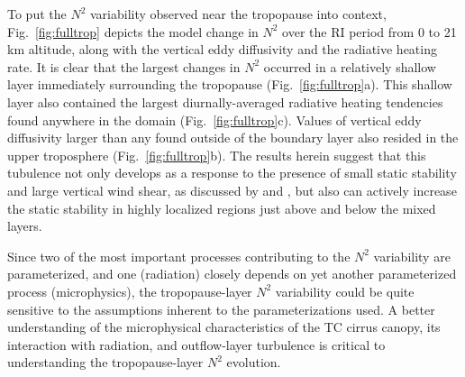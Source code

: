 \documentclass{ametsoc}
\begin{document}
To put the $N^2$ variability observed near the tropopause into context, Fig.~\ref{fig:fulltrop} depicts the model change in $N^2$ over the RI period from 0 to 21 km altitude, along with the vertical eddy diffusivity and the radiative heating rate.
It is clear that the largest changes in $N^2$ occurred in a relatively shallow layer immediately surrounding the tropopause (Fig.~\ref{fig:fulltrop}a).
This shallow layer also contained the largest diurnally-averaged radiative heating tendencies found anywhere in the domain (Fig.~\ref{fig:fulltrop}c).
Values of vertical eddy diffusivity larger than any found outside of the boundary layer also resided in the upper troposphere (Fig.~\ref{fig:fulltrop}b).
The results herein suggest that this tubulence not only develops as a response to the presence of small static stability and large vertical wind shear, as discussed by \cite{Molinarietal} and \cite{DuranMolinari2016}, but also can actively increase the static stability in highly localized regions just above and below the mixed layers.

Since two of the most important processes contributing to the $N^2$ variability are parameterized, and one (radiation) closely depends on yet another parameterized process (microphysics), the tropopause-layer $N^2$ variability could be quite sensitive to the assumptions inherent to the parameterizations used.
A better understanding of the microphysical characteristics of the TC cirrus canopy, its interaction with radiation, and outflow-layer turbulence is critical to understanding the tropopause-layer $N^2$ evolution.


\end{document}
